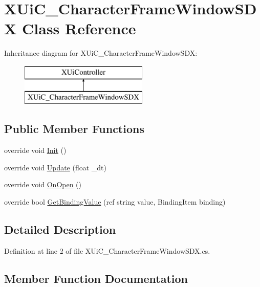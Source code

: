 \hypertarget{class_x_ui_c___character_frame_window_s_d_x}{}\section{X\+Ui\+C\+\_\+\+Character\+Frame\+Window\+S\+DX Class Reference}
\label{class_x_ui_c___character_frame_window_s_d_x}
Inheritance diagram for X\+Ui\+C\+\_\+\+Character\+Frame\+Window\+S\+DX\+:\begin{figure}[H]
\begin{center}
\leavevmode
\includegraphics[height=2.000000cm]{class_x_ui_c___character_frame_window_s_d_x}
\end{center}
\end{figure}
\subsection*{Public Member Functions}
\begin{DoxyCompactItemize}
\item 
override void \mbox{\hyperlink{class_x_ui_c___character_frame_window_s_d_x_a5adbffd6a1624cc71b92fa1430fbd325}{Init}} ()
\item 
override void \mbox{\hyperlink{class_x_ui_c___character_frame_window_s_d_x_a7bda15f5e5dca51a1f426a2893ca6a6d}{Update}} (float \+\_\+dt)
\item 
override void \mbox{\hyperlink{class_x_ui_c___character_frame_window_s_d_x_ade8c88125fd81efcf5f2cd2441bec993}{On\+Open}} ()
\item 
override bool \mbox{\hyperlink{class_x_ui_c___character_frame_window_s_d_x_a41cbb997886b20c30c32d773af272789}{Get\+Binding\+Value}} (ref string value, Binding\+Item binding)
\end{DoxyCompactItemize}


\subsection{Detailed Description}


Definition at line 2 of file X\+Ui\+C\+\_\+\+Character\+Frame\+Window\+S\+D\+X.\+cs.



\subsection{Member Function Documentation}
\mbox{\label{class_x_ui_c___character_frame_window_s_d_x_a41cbb997886b20c30c32d773af272789}} 
